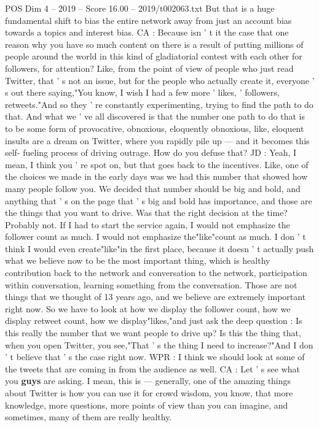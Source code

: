 \begin{textsample}{POS Dim 4 – 2019 – Score 16.00 – 2019/t002063.txt}
But that is a huge fundamental shift to bias the entire network away from just an account bias towards a topics and interest bias.
CA : Because isn ' t it the case that one reason why you have so much content on there is a result of putting millions of people around the world in this kind of gladiatorial contest with each other for followers, for attention?
Like, from the point of view of people who just read Twitter, that ' s not an issue, but for the people who actually create it, everyone ' s out there saying,"You know, I wish I had a few more ' likes, ' followers, retweets."And so they ' re constantly experimenting, trying to find the path to do that.
And what we ' ve all discovered is that the number one path to do that is to be some form of provocative, obnoxious, eloquently obnoxious, like, eloquent insults are a dream on Twitter, where you rapidly pile up — and it becomes this self- fueling process of driving outrage.
How do you defuse that?
JD : Yeah, I mean, I think you ' re spot on, but that goes back to the incentives.
Like, one of the choices we made in the early days was we had this number that showed how many people follow you.
We decided that number should be big and bold, and anything that ' s on the page that ' s big and bold has importance, and those are the things that you want to drive.
Was that the right decision at the time?
Probably not.
If I had to start the service again, I would not emphasize the follower count as much.
I would not emphasize the"like"count as much.
I don ' t think I would even create"like"in the first place, because it doesn ' t actually push what we believe now to be the most important thing, which is healthy contribution back to the network and conversation to the network, participation within conversation, learning something from the conversation.
Those are not things that we thought of 13 years ago, and we believe are extremely important right now.
So we have to look at how we display the follower count, how we display retweet count, how we display"likes,"and just ask the deep question : Is this really the number that we want people to drive up?
Is this the thing that, when you open Twitter, you see,"That ' s the thing I need to increase?"And I don ' t believe that ' s the case right now.
WPR : I think we should look at some of the tweets that are coming in from the audience as well.
CA : Let ' s see what you \textbf{guys} are asking.
I mean, this is — generally, one of the amazing things about Twitter is how you can use it for crowd wisdom, you know, that more knowledge, more questions, more points of view than you can imagine, and sometimes, many of them are really healthy.

\end{textsample}
